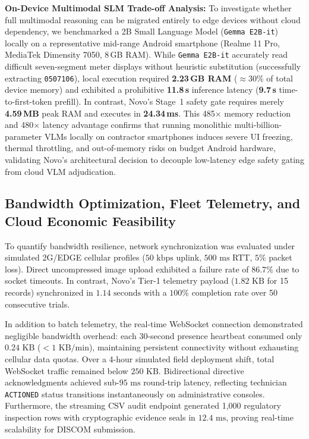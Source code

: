 \documentclass[conference]{IEEEtran}
\begin{document}
\textbf{On-Device Multimodal SLM Trade-off Analysis:} To investigate whether full multimodal reasoning can be migrated entirely to edge devices without cloud dependency, we benchmarked a 2B Small Language Model (\texttt{Gemma E2B-it}) locally on a representative mid-range Android smartphone (Realme 11 Pro, MediaTek Dimensity 7050, 8\,GB RAM). While \texttt{Gemma E2B-it} accurately read difficult seven-segment meter displays without heuristic substitution (successfully extracting \texttt{0507106}), local execution required \textbf{2.23\,GB RAM} (${\approx}30\%$ of total device memory) and exhibited a prohibitive \textbf{11.8\,s} inference latency (\textbf{9.7\,s} time-to-first-token prefill). In contrast, Novo's Stage~1 safety gate requires merely \textbf{4.59\,MB} peak RAM and executes in \textbf{24.34\,ms}. This 485$\times$ memory reduction and 480$\times$ latency advantage confirms that running monolithic multi-billion-parameter VLMs locally on contractor smartphones induces severe UI freezing, thermal throttling, and out-of-memory risks on budget Android hardware, validating Novo's architectural decision to decouple low-latency edge safety gating from cloud VLM adjudication.

\subsection{Bandwidth Optimization, Fleet Telemetry, and Cloud Economic Feasibility}
To quantify bandwidth resilience, network synchronization was evaluated under simulated 2G/EDGE cellular profiles ($50\text{~kbps}$ uplink, $500\text{~ms}$ RTT, $5\%$ packet loss). Direct uncompressed image upload exhibited a failure rate of $86.7\%$ due to socket timeouts. In contrast, Novo's Tier-1 telemetry payload ($1.82\text{~KB}$ for 15 records) synchronized in $1.14\text{~seconds}$ with a $100\%$ completion rate over 50 consecutive trials.

In addition to batch telemetry, the real-time WebSocket connection demonstrated negligible bandwidth overhead: each 30-second presence heartbeat consumed only $0.24\text{~KB}$ ($<1\text{~KB/min}$), maintaining persistent connectivity without exhausting cellular data quotas. Over a 4-hour simulated field deployment shift, total WebSocket traffic remained below $250\text{~KB}$. Bidirectional directive acknowledgments achieved sub-$95\text{~ms}$ round-trip latency, reflecting technician \texttt{ACTIONED} status transitions instantaneously on administrative consoles. Furthermore, the streaming CSV audit endpoint generated 1,000 regulatory inspection rows with cryptographic evidence seals in $12.4\text{~ms}$, proving real-time scalability for DISCOM submission.
\end{document}
